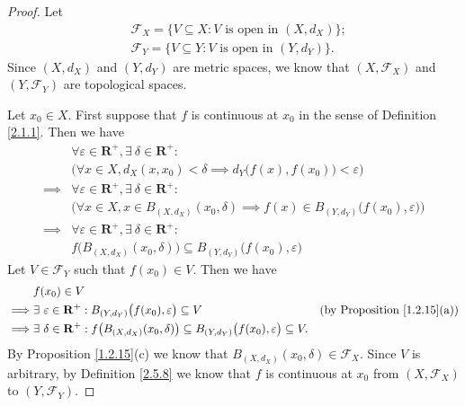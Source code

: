 \begin{proof}
    Let
    \begin{align*}
         & \mathcal{F}_X = \{V \subseteq X : V \text{ is open in } (X, d_X)\}; \\
         & \mathcal{F}_Y = \{V \subseteq Y : V \text{ is open in } (Y, d_Y)\}.
    \end{align*}
    Since \((X, d_X)\) and \((Y, d_Y)\) are metric spaces, we know that \((X, \mathcal{F}_X)\) and \((Y, \mathcal{F}_Y)\) are topological spaces.

    Let \(x_0 \in X\).
    First suppose that \(f\) is continuous at \(x_0\) in the sense of Definition \ref{2.1.1}.
    Then we have
    \begin{align*}
                 & \forall \varepsilon \in \mathbf{R}^+, \exists\ \delta \in \mathbf{R}^+ :                                               \\
                 & \Big(\forall x \in X, d_X(x, x_0) < \delta \implies d_Y\big(f(x), f(x_0)\big) < \varepsilon\Big)                       \\
        \implies & \forall \varepsilon \in \mathbf{R}^+, \exists\ \delta \in \mathbf{R}^+ :                                               \\
                 & \Big(\forall x \in X, x \in B_{(X, d_X)}(x_0, \delta) \implies f(x) \in B_{(Y, d_Y)}\big(f(x_0), \varepsilon\big)\Big) \\
        \implies & \forall \varepsilon \in \mathbf{R}^+, \exists\ \delta \in \mathbf{R}^+ :                                               \\
                 & f\big(B_{(X, d_X)}(x_0, \delta)\big) \subseteq B_{(Y, d_Y)}\big(f(x_0), \varepsilon\big)
    \end{align*}
    Let \(V \in \mathcal{F}_Y\) such that \(f(x_0) \in V\).
    Then we have
    \begin{align*}
                 & f(x_0) \in V                                                                                                                                                                       \\
        \implies & \exists\ \varepsilon \in \mathbf{R}^+ : B_{(Y, d_Y)}\big(f(x_0), \varepsilon\big) \subseteq V                                            & \text{(by Proposition \ref{1.2.15}(a))} \\
        \implies & \exists\ \delta \in \mathbf{R}^+ : f\big(B_{(X, d_X)}(x_0, \delta)\big) \subseteq B_{(Y, d_Y)}\big(f(x_0), \varepsilon\big) \subseteq V.
    \end{align*}
    By Proposition \ref{1.2.15}(c) we know that \(B_{(X, d_X)}(x_0, \delta) \in \mathcal{F}_X\).
    Since \(V\) is arbitrary, by Definition \ref{2.5.8} we know that \(f\) is continuous at \(x_0\) from \((X, \mathcal{F}_X)\) to \((Y, \mathcal{F}_Y)\).


\end{proof}
